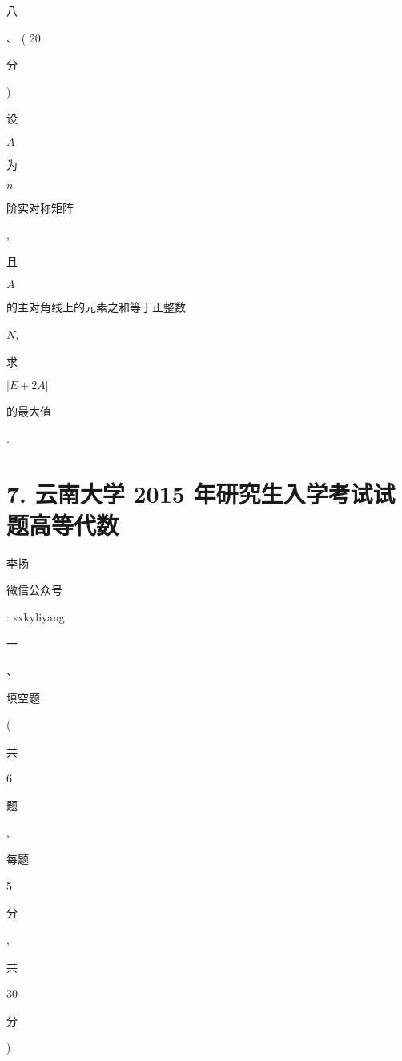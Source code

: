 \documentclass[10pt]{article}
\begin{document}
\begin{CJK}{UTF8}{mj}八\end{CJK}、 ( 20 \begin{CJK}{UTF8}{mj}分\end{CJK}) \begin{CJK}{UTF8}{mj}设\end{CJK} $A$ \begin{CJK}{UTF8}{mj}为\end{CJK} $n$ \begin{CJK}{UTF8}{mj}阶实对称矩阵\end{CJK}, \begin{CJK}{UTF8}{mj}且\end{CJK} $A$ \begin{CJK}{UTF8}{mj}的主对角线上的元素之和等于正整数\end{CJK} $N$, \begin{CJK}{UTF8}{mj}求\end{CJK} $|E+2 A|$ \begin{CJK}{UTF8}{mj}的最大值\end{CJK}.

\section{7. 云南大学 2015 年研究生入学考试试题高等代数}
\begin{CJK}{UTF8}{mj}李扬\end{CJK}

\begin{CJK}{UTF8}{mj}微信公众号\end{CJK}: sxkyliyang

\begin{CJK}{UTF8}{mj}一\end{CJK}、\begin{CJK}{UTF8}{mj}填空题\end{CJK} (\begin{CJK}{UTF8}{mj}共\end{CJK} 6 \begin{CJK}{UTF8}{mj}题\end{CJK}, \begin{CJK}{UTF8}{mj}每题\end{CJK} 5 \begin{CJK}{UTF8}{mj}分\end{CJK}, \begin{CJK}{UTF8}{mj}共\end{CJK} 30 \begin{CJK}{UTF8}{mj}分\end{CJK})
\end{document}
